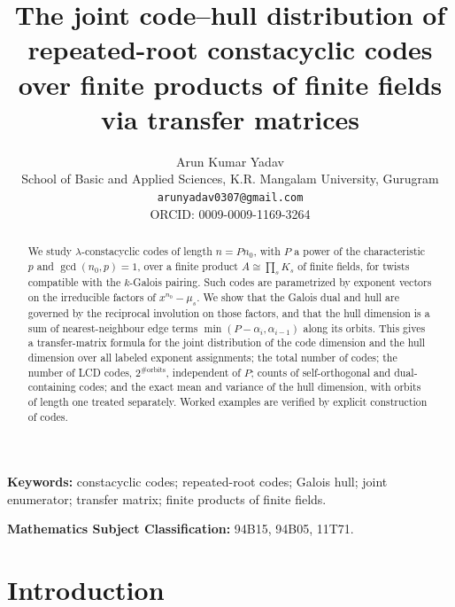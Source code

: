 \documentclass[11pt]{article}
\title{The joint code--hull distribution of repeated-root constacyclic codes
over finite products of finite fields via transfer matrices}
\author{Arun Kumar Yadav\\ School of Basic and Applied Sciences, K.R. Mangalam University, Gurugram\\ \texttt{arunyadav0307@gmail.com}\\ ORCID: 0009-0009-1169-3264}
\date{}
\theoremstyle{definition}
\theoremstyle{remark}
\begin{document}
\maketitle

\begin{abstract}
We study \(\lambda\)-constacyclic codes of length \(n = P n_0\), with
\(P\) a power of the characteristic \(p\) and \(\gcd(n_0, p) = 1\), over a
finite product \(A \cong \prod_s K_s\) of finite fields, for twists
compatible with the \(k\)-Galois pairing. Such codes are parametrized by
exponent vectors on the irreducible factors of \(x^{n_0} - \mu_s\). We
show that the Galois dual and hull are governed by the reciprocal
involution on those factors, and that the hull dimension is a sum of
nearest-neighbour edge terms \(\min(P - \alpha_i, \alpha_{i-1})\) along
its orbits. This gives a transfer-matrix formula for the joint
distribution of the code dimension and the hull dimension over all
labeled exponent assignments; the total number of codes; the number of
LCD codes, \(2^{\#\mathrm{orbits}}\), independent of \(P\); counts of
self-orthogonal and dual-containing codes; and the exact mean and
variance of the hull dimension, with orbits of length one treated
separately. Worked examples are verified by explicit construction of
codes.
\end{abstract}

\noindent\textbf{Keywords:} constacyclic codes; repeated-root codes;
Galois hull; joint enumerator; transfer matrix; finite products of finite fields.

\noindent\textbf{Mathematics Subject Classification:} 94B15, 94B05, 11T71.

\section{Introduction}
\end{document}
